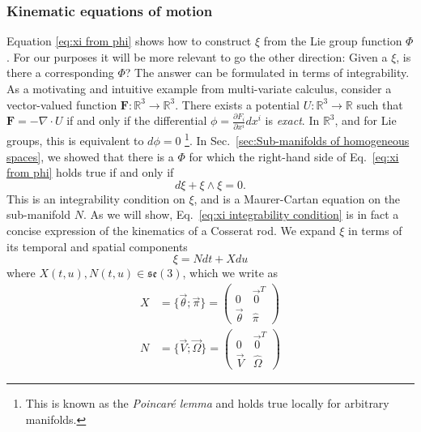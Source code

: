 \subsubsection*{Kinematic equations of motion}

Equation \ref{eq:xi from phi} shows how to construct $\xi$ from the Lie group function $\Phi$. For our purposes it will be more relevant to go the other direction: Given a $\xi$, is there a corresponding $\Phi$? The answer can be formulated in terms of integrability. As a motivating and intuitive example from multi-variate calculus, consider a vector-valued function $\mathbf{F} : \mathbb{R}^3 \to \mathbb{R}^3$. There exists a potential $U : \mathbb{R}^3 \to \mathbb{R}$ such that $\mathbf{F} = - \nabla \cdot U$ if and only if the differential $\phi = \frac{\partial F_i}{\partial x^i} dx^i$ is \textit{exact}. In $\mathbb{R}^3$, and for Lie groups, this is equivalent to $d \phi = 0$ \footnote{This is known as the \textit{Poincaré lemma} and holds true locally for arbitrary manifolds.}. In Sec.~\ref{sec:Sub-manifolds of homogeneous spaces}, we showed that there is a $\Phi$ for which the right-hand side of Eq.~\ref{eq:xi from phi} holds true if and only if
\begin{equation} \label{eq:xi integrability condition}
d\xi + \xi \wedge \xi = 0.
\end{equation}
This is an integrability condition on $\xi$, and is a Maurer-Cartan equation on the sub-manifold $N$. As we will show, Eq.~\ref{eq:xi integrability condition} is in fact a concise expression of the kinematics of a Cosserat rod. We expand $\xi$ in terms of its temporal and spatial components
\begin{equation} \label{eq:xi = X + N}
\xi = N dt + X du
\end{equation}
where $X(t, u), N(t, u) \in \mathfrak{se}(3)$, which we write as
\begin{subequations} \label{eq:X and Y defs}
\begin{align}
X & = \{ \vec{\theta} ; \vec{\pi} \} =  \begin{pmatrix}
	0 & \vec{0}^T \\
	\vec{\theta} & \hat{\pi} 
\end{pmatrix} \label{eq:X def} \\ 
N & = \{ \vec{V} ; \vec{\Omega} \} = \begin{pmatrix}
	0 & \vec{0}^T \\
	\vec{V} & \hat{\Omega} 
\end{pmatrix}
\end{align}
\end{subequations}
